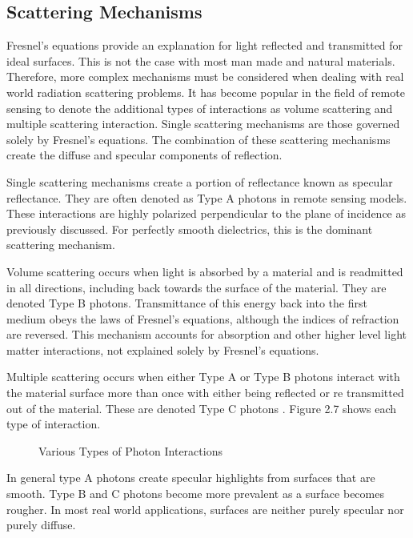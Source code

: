 \subsection{Scattering Mechanisms}

Fresnel’s equations provide an explanation for light reflected and transmitted for ideal surfaces.  This is not the case with most man made and natural materials.  Therefore, more complex mechanisms must be considered when dealing with real world radiation scattering problems.  It has become popular in the field of remote sensing to denote the additional types of interactions as volume scattering and multiple scattering
 interaction.  Single scattering mechanisms are those governed solely by Fresnel’s equations.  The combination of these scattering mechanisms create the diffuse and specular components of reflection.

Single scattering mechanisms create a portion of reflectance known as specular reflectance.  They are often denoted as Type A photons in remote sensing models.  These interactions are highly polarized perpendicular to the plane of incidence as previously discussed. For perfectly smooth dielectrics, this is the dominant scattering mechanism.

Volume scattering occurs when light is absorbed by a material and is readmitted in all directions, including back towards the surface of the material.  They are denoted Type B photons.  Transmittance of this energy back into the first medium obeys the laws of Fresnel’s equations, although the indices of refraction are reversed.  This mechanism accounts for absorption and other higher level light matter interactions, not explained solely by Fresnel’s equations.

Multiple scattering occurs when either Type A or Type B photons interact with the material surface more than once with either being reflected or re transmitted out of the material.  These are denoted Type C photons \cite{schott}.  Figure 2.7 shows each type of interaction.
%
\begin{figure}
    \begin{center}
    \end{center}
    \caption{Various Types of Photon Interactions}
    \label{fig:scattering}
\end{figure}
%
In general type A photons create specular highlights from surfaces that are smooth.  Type B and C photons become more prevalent as a surface becomes rougher.  In most real world applications, surfaces are neither purely specular nor purely diffuse.

